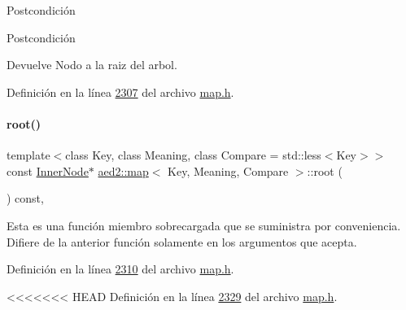 \begin{DoxyPostcond}{\-Postcondición}
\begin{DoxyPostcond}{\-Postcondición}
\begin{DoxyReturn}{Devuelve}
Nodo a la raiz del arbol. 
\end{DoxyReturn}


Definición en la línea \hyperlink{map_8h_source_l02307}{2307} del archivo \hyperlink{map_8h_source}{map.\+h}.

\mbox{\label{classaed2_1_1map_a66fe019d885578cc52949409f80858eb_a66fe019d885578cc52949409f80858eb}} 
\paragraph{\texorpdfstring{root()}{root()}\hspace{0.1cm}{\footnotesize\ttfamily [2/2]}}
{\footnotesize\ttfamily template$<$class Key, class Meaning, class Compare = std\+::less$<$\+Key$>$$>$ \\
const \hyperlink{structaed2_1_1map_1_1InnerNode}{Inner\+Node}$\ast$ \hyperlink{classaed2_1_1map}{aed2\+::map}$<$ Key, Meaning, Compare $>$\+::root (\begin{DoxyParamCaption}{ }\end{DoxyParamCaption}) const\hspace{0.3cm}{\ttfamily [inline]}, {\ttfamily [private]}}

Esta es una función miembro sobrecargada que se suministra por conveniencia. Difiere de la anterior función solamente en los argumentos que acepta. 

Definición en la línea \hyperlink{map_8h_source_l02310}{2310} del archivo \hyperlink{map_8h_source}{map.\+h}.

<<<<<<< HEAD
\-Definición en la línea \hyperlink{map_8h_source_l02329}{2329} del archivo \hyperlink{map_8h_source}{map.\-h}.

\hypertarget{classaed2_1_1map_aa079b9390f988f97be26fd51ed44a2c9_aa079b9390f988f97be26fd51ed44a2c9}{
}
\end{DoxyPostcond}
\end{DoxyPostcond}
